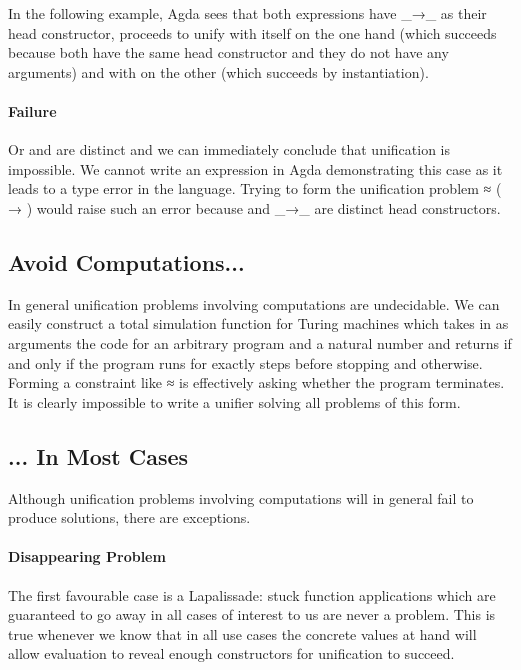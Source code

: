 In the following example, Agda sees that both expressions have {\_→\_} as their
head constructor, proceeds to unify  with itself on the one hand (which
succeeds because both have the same head constructor and they do not have any
arguments) and  with  on the other (which succeeds by instantiation).


\paragraph{Failure} Or  and  are distinct and we can immediately
conclude that unification is impossible. We cannot write an expression in Agda
demonstrating this case as it leads to a type error in the language.
Trying to form the unification problem { ≈ (\AB{\_} → \AB{\_})} would
raise such an error because  and {\_→\_} are distinct head constructors.

\subsection{Avoid Computations...}

In general unification problems involving computations are undecidable.
We can easily construct a total simulation function  for Turing
machines which takes in as arguments the code for an arbitrary program 
and a natural number  and returns  if and only if the program runs
for exactly  steps before stopping and  otherwise. Forming a
constraint like {  \AB{\_} ≈ } is effectively asking
whether the program  terminates. It is clearly impossible to write a
unifier solving all problems of this form.



\subsection{... In Most Cases}\label{sec:unifiermagic}

Although unification problems involving computations will in general fail
to produce solutions, there are exceptions.


\paragraph{Disappearing Problem} The first favourable case is a Lapalissade:
stuck function applications which are guaranteed to go away in all cases of
interest to us are never a problem. This is true whenever we know that in all
use cases the concrete values at hand will allow evaluation to reveal enough
constructors for unification to succeed.

